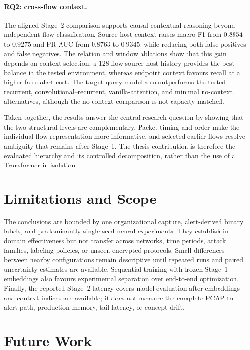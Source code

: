 \documentclass[11pt,fleqn]{report}
\begin{document}
\paragraph{RQ2: cross-flow context.}
The aligned Stage~2 comparison supports causal contextual reasoning beyond
independent flow classification. Source-host context raises macro-F1 from
$0.8954$ to $0.9275$ and PR-AUC from $0.8763$ to $0.9345$, while reducing both
false positives and false negatives. The relation and window ablations show
that this gain depends on context selection: a 128-flow source-host history
provides the best balance in the tested environment, whereas endpoint context
favours recall at a higher false-alert cost. The target-query model also
outperforms the tested recurrent, convolutional--recurrent, vanilla-attention,
and minimal no-context alternatives, although the no-context comparison is not
capacity matched.

Taken together, the results answer the central research question by showing
that the two structural levels are complementary. Packet timing and order make
the individual-flow representation more informative, and selected earlier
flows resolve ambiguity that remains after Stage~1. The thesis contribution is
therefore the evaluated hierarchy and its controlled decomposition, rather than
the use of a Transformer in isolation.

\section{Limitations and Scope}
\label{subsec:conclusion_limitations}

The conclusions are bounded by one organizational capture, alert-derived binary
labels, and predominantly single-seed neural experiments. They establish
in-domain effectiveness but not transfer across networks, time periods, attack
families, labeling policies, or unseen encrypted protocols. Small differences
between nearby configurations remain descriptive until repeated runs and paired
uncertainty estimates are available. Sequential training with frozen Stage~1
embeddings also favours experimental separation over end-to-end optimization.
Finally, the reported Stage~2 latency covers model evaluation after embeddings
and context indices are available; it does not measure the complete
PCAP-to-alert path, production memory, tail latency, or concept drift.

\section{Future Work}
\label{subsec:conclusion_future_work}
\end{document}
